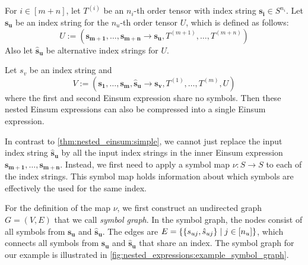 \begin{theorem}
    \label{thm:nested_einsum:general}
    For $i \in [m + n]$, let $T^{(i)}$ be an $n_i$-th order tensor with index string $\bm{s_i} \in S^{n_i}$.
    Let $\bm{s_u}$ be an index string for the $n_u$-th order tensor $U$, which is defined as follows:
    $$U := (\bm{s_{m + 1}},\dots,\bm{s_{m + n}} \rightarrow \bm{s_u}, T^{(m + 1)},\dots,T^{(m + n)})$$
    Also let $\bm{\hat{s}_u}$ be alternative index strings for $U$.

    Let $s_v$ be an index string and
    $$V := (\bm{s_1},\dots,\bm{s_m}, \bm{\hat{s}_u} \rightarrow \bm{s_v}, T^{(1)},\dots,T^{(m)}, U)$$
    where the first and second Einsum expression share no symbols.
    Then these nested Einsum expressions can also be compressed into a single Einsum expression.

    In contrast to \cref{thm:nested_einsum:simple}, we cannot just replace the input index string $\bm{\hat{s}_u}$ by all the input index strings in the inner Einsum expression $\bm{s_{m + 1}},\dots,\bm{s_{m + n}}$.
    Instead, we first need to apply a symbol map $\nu: S \rightarrow S$ to each of the index strings.
    This symbol map holds information about which symbols are effectively the used for the same index.

    For the definition of the map $\nu$, we first construct an undirected graph $G = (V, E)$ that we call \textit{symbol graph}.
    In the symbol graph, the nodes consist of all symbols from $\bm{s_u}$ and $\bm{\hat{s}_u}$.
    The edges are $E = \lbrace \lbrace s_{uj}, \hat{s}_{uj} \rbrace \mid j \in [n_u] \rbrace$,
    which connects all symbols from $\bm{s_u}$ and $\bm{\hat{s}_u}$ that share an index.
    The symbol graph for our example is illustrated in \cref{fig:nested_expressions:example_symbol_graph}.

    \begin{figure}[h]
        \centering
\end{figure}
\end{theorem}
